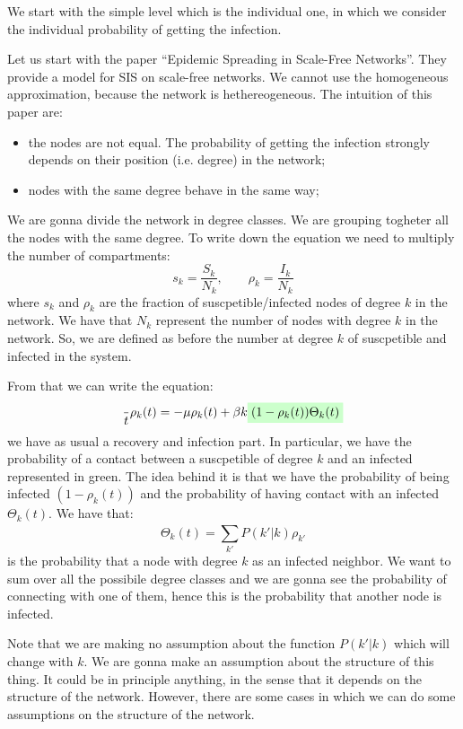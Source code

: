 \documentclass[../main/main.tex]{subfiles}
\begin{document}
We start with the simple level which is the individual one, in which we consider the individual probability of getting the infection.

Let us start with the paper “Epidemic Spreading in Scale-Free Networks”. They provide a model for SIS on scale-free networks. We cannot use the homogeneous approximation, because the network is hethereogeneous. The intuition of this paper are:
\begin{itemize}
\item the nodes are not equal. The probability of getting the infection strongly depends on their position (i.e. degree) in the network;
\item nodes with the same degree behave in the same way;
\end{itemize}
We are gonna divide the network in degree classes. We are grouping togheter all the nodes with the same degree. To write down the equation we need to multiply the number of compartments:
\begin{equation*}
  s_k = \frac{S_k}{N_k}, \qquad \rho _k = \frac{I_k}{N_k}
\end{equation*}
where \( s_k \) and \( \rho _k \) are the fraction of suscpetible/infected nodes of degree \( k \) in the network. We have that \( N_k \) represent the number of nodes with degree \( k \) in the network. So, we are defined as before the number at degree \( k \) of suscpetible and infected in the system.

From that we can write the equation:
\begin{equation*}
  \frac{}{t} \rho _k (t) = - \mu \rho _k (t) + \beta k \mathcolorbox{green!20}{(1- \rho _k (t)) \Theta _k (t)}
\end{equation*}
we have as usual a recovery and infection part. In particular, we have the probability of a contact between a suscpetible of degree \( k \) and an infected represented in green.
The idea behind it is that we have the probability of being infected \( (1- \rho _k (t)) \) and the probability of having contact with an infected \( \Theta _k (t) \).
We have that:
\begin{equation*}
  \Theta _k(t) = \sum_{k'}^{} P(k'|k)\rho _{k'}
\end{equation*}
is the probability that a node with degree \( k \) as an infected neighbor. We want to sum over all the possibile degree classes and we are gonna see the probability of connecting with one of them, hence this is the probability that another node is infected.

Note that we are making no assumption about the function \(  P(k'|k) \) which will change with \( k \).
We are gonna make an assumption about the structure of this thing.
It could be in principle anything, in the sense that it depends on the structure of the network. However, there are some cases in which we can do some assumptions on the structure of the network.
\end{document}
